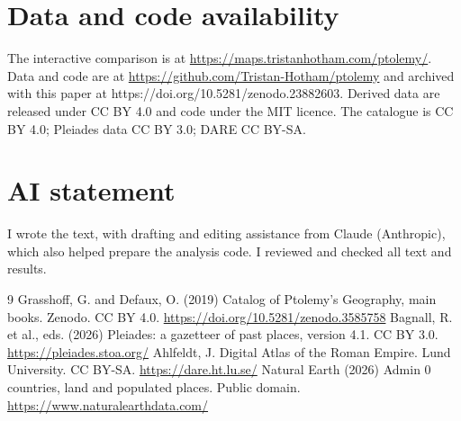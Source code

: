 \documentclass[11pt,a4paper]{article}
\begin{document}
\section*{Data and code availability}
The interactive comparison is at \url{https://maps.tristanhotham.com/ptolemy/}. Data and code are at \url{https://github.com/Tristan-Hotham/ptolemy} and archived with this paper at https://doi.org/10.5281/zenodo.23882603. Derived data are released under CC BY 4.0 and code under the MIT licence. The catalogue is CC BY 4.0; Pleiades data CC BY 3.0; DARE CC BY-SA.

\section*{AI statement}
I wrote the text, with drafting and editing assistance from Claude (Anthropic), which also helped prepare the analysis code. I reviewed and checked all text and results.

\begin{thebibliography}{9}
 Grasshoff, G. and Defaux, O. (2019) Catalog of Ptolemy's Geography, main books. Zenodo. CC BY 4.0. \url{https://doi.org/10.5281/zenodo.3585758}
 Bagnall, R. et al., eds. (2026) Pleiades: a gazetteer of past places, version 4.1. CC BY 3.0. \url{https://pleiades.stoa.org/}
 Ahlfeldt, J. Digital Atlas of the Roman Empire. Lund University. CC BY-SA. \url{https://dare.ht.lu.se/}
 Natural Earth (2026) Admin 0 countries, land and populated places. Public domain. \url{https://www.naturalearthdata.com/}
\end{thebibliography}
\end{document}
